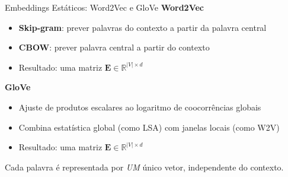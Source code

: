 \documentclass[aspectratio=169, xcolor=dvipsnames]{beamer}
\begin{document}
  \begin{frame}{Embeddings Estáticos: Word2Vec e GloVe}
        \textbf{Word2Vec} 
        \begin{itemize}
          \item \textbf{Skip-gram}: prever palavras do contexto a partir da palavra central
          \item \textbf{CBOW}: prever palavra central a partir do contexto
          \item Resultado: uma matriz $\mathbf{E} \in \mathbb{R}^{|V| \times d}$
        \end{itemize}
        \textbf{GloVe} 
        \begin{itemize}
          \item Ajuste de produtos escalares ao logaritmo de coocorrências globais
          \item Combina estatística global (como LSA) com janelas locais (como W2V)
          \item Resultado: uma matriz $\mathbf{E} \in \mathbb{R}^{|V| \times d}$
        \end{itemize}
      Cada palavra é representada por \textit{UM} único vetor, independente do contexto.
  \end{frame}
\end{document}
